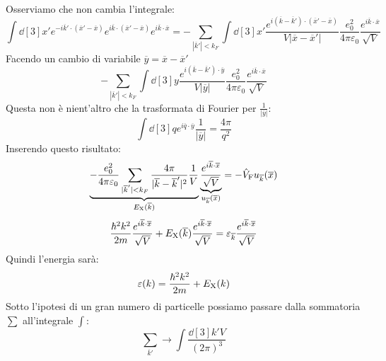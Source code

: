 Osserviamo che non cambia l'integrale:
\begin{equation*}
    \int \dd[3]{x'}e^{-i\overline{k}'\cdot(\overline{x}'-\overline{x})}e^{i\overline{k}\cdot(\overline{x}'-\overline{x})}e^{i\overline{k}\cdot\overline{x}} = -\sum_{|\overline{k}'|<k_F}\int \dd[3]{x'}\frac{e^{i(\overline{k}-\overline{k}')\cdot(\overline{x}'-\overline{x})}}{V|\overline{x}-\overline{x}'|}\frac{e_0^2}{4\pi\varepsilon_0}\frac{e^{i\overline{k}\cdot\overline{x}}}{\sqrt V}
\end{equation*}
Facendo un cambio di variabile $\overline{y}=\overline{x}-\overline{x}'$
\begin{equation*}
    -\sum_{|\overline{k}'|<k_F}\int\dd[3]{y}\frac{e^{i(\overline k -\overline k')\cdot\overline y}}{V|\overline y|}\frac{e_0^2}{4\pi\varepsilon_0}\frac{e^{i\overline k \cdot \overline x}}{\sqrt V}
\end{equation*}
Questa non è nient'altro che la trasformata di Fourier per $\frac{1}{|\overline y|}$:
\begin{equation*}
    \int \dd[3]{q}e^{i\overline q \cdot \overline y}\frac{1}{|\overline y|}=\frac{4\pi}{q^2}
\end{equation*}
Inserendo questo risultato:
\begin{equation*}
    \underbrace{-\frac{e_0^2}{4\pi\varepsilon_0}\sum_{|\overline{k}'|<k_F}\frac{4\pi}{|\overline k - \overline k '|^2}\frac{1}{V}}_{E_\text{X}(\overline k)}\underbrace{\frac{e^{i\overline k \cdot \overline x}}{\sqrt V}}_{u_{\overline k}(\overline x)}=-\hat V_{\text F}u_{\overline k}(\overline x)
\end{equation*}
\begin{equation*}
    \frac{\hbar^2k^2}{2m}\frac{e^{i\overline k \cdot \overline x}}{\sqrt V}+E_{\text X}(\overline k)\frac{e^{i\overline k \cdot \overline x}}{\sqrt V}=\varepsilon_{\overline k}\frac{e^{i\overline k \cdot \overline x}}{\sqrt V}
\end{equation*}
Quindi l'energia sarà:
\begin{equation*}
    \varepsilon(k)=\frac{\hbar^2k^2}{2m}+E_{\text X}(k)
\end{equation*}
Sotto l'ipotesi di un gran numero di particelle possiamo passare dalla sommatoria $\sum$ all'integrale $\int$:
\begin{equation*}
    \sum_{\overline k'} \rightarrow \int \frac{\dd[3]{k'}V}{(2\pi)^3}
\end{equation*}
